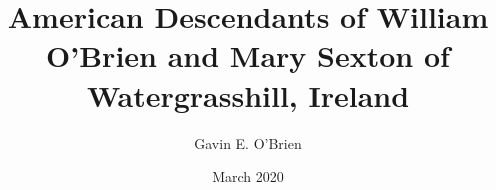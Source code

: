 \documentclass[oneside,letterpaper,12pt]{memoir}
\begin{document}
\author{Gavin E. O'Brien}
\title{American Descendants of William O'Brien and Mary Sexton of Watergrasshill, Ireland}
\date{March 2020}

\maketitle
\tableofcontents




\end{document}
